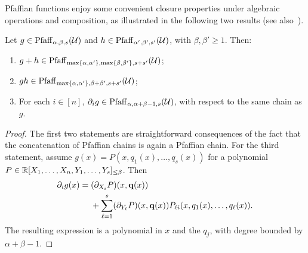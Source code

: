 

Pfaffian functions enjoy some convenient closure properties under algebraic operations and composition, as illustrated in the following two results (see also~\cite[Proposition 1.8]{zell2003quantitative}).

\begin{lemma}\label{le:pfaffalgebra}
Let $g\in \mathrm{Pfaff}_{\alpha, \beta, s}(\mathcal{U})$ and $h\in \mathrm{Pfaff}_{\alpha', \beta', s'}(\mathcal{U})$, with $\beta,\beta'\ge1$. Then:
\begin{enumerate}
\item $g + h \in \mathrm{Pfaff}_{\max\{\alpha,\alpha'\}, \max\{\beta,\beta'\},s+s'}(\mathcal{U})$;
\item $gh \in \mathrm{Pfaff}_{\max\{\alpha,\alpha'\}, \beta+\beta',s+s'}(\mathcal{U})$;
\item For each $i\in [n]$, $\partial_i g \in \mathrm{Pfaff}_{\alpha,\alpha+\beta-1,s}(\mathcal{U})$, with respect to the same chain as $g$.
\end{enumerate}
\end{lemma}

\begin{proof}
The first two statements are straightforward consequences of the fact that the concatenation of Pfaffian chains is again a Pfaffian chain. For the third statement, assume $g(x)=P(x,q_1(x),\dots,q_s(x))$ for a polynomial $P\in \mathbb{R}[X_1,\dots,X_n,Y_1,\dots,Y_s]_{\leq \beta}$. Then
\begin{align*}
\partial_i g(x)={}&(\partial_{X_i}P)(x,\mathbf{q}(x))\\
&+\sum_{\ell=1}^s(\partial_{Y_\ell}P)(x,\mathbf{q}(x))
P_{\ell i}(x,q_1(x),\dots,q_\ell(x)).
\end{align*}
The resulting expression is a polynomial in $x$ and the $q_j$, with degree bounded by $\alpha+\beta-1$.
\end{proof}

